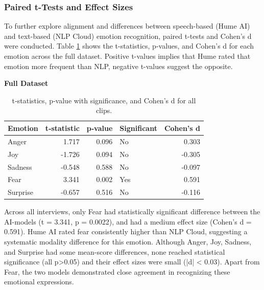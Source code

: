 \subsubsection{Paired t-Tests and Effect Sizes}
To further explore alignment and differences between speech-based (Hume AI) and text-based (NLP Cloud) emotion recognition, paired t-tests and Cohen's d were conducted. 
Table \ref{tab:t-test-all} shows the t-statistics, p-values, and Cohen's d for each emotion across the full dataset. Positive t-values implies that Hume rated that emotion more frequent than NLP, negative t-values suggest the opposite.

\begin{table}[H]
    \centering
    \caption*{\textbf{Full Dataset}}
    \begin{tabular}{lrrlr}
      \toprule
      \textbf{Emotion} & \textbf{t‐statistic} & \textbf{p‐value} & \textbf{Significant} & \textbf{Cohen’s d} \\
      \midrule
      Anger    &  1.717 & 0.096  & No  &  0.303 \\
      Joy      & -1.726 & 0.094  & No  & -0.305 \\
      Sadness  & -0.548 & 0.588  & No  & -0.097 \\
      Fear     &  3.341 & 0.002  & Yes &  0.591 \\
      Surprise & -0.657 & 0.516  & No  & -0.116 \\
      \bottomrule
    \end{tabular}
    \caption{t‐statistics, p‐value with significance, and Cohen’s d for all clips.}
    \label{tab:t-test-all}
\end{table}
Across all interviews, only Fear had statistically significant difference between the AI-models (t = 3.341, p = 0.0022), and had a medium effect size (Cohen's d = 0.591).
Hume AI rated fear consistently higher than NLP Cloud, suggesting a systematic modality difference for this emotion. 
Although Anger, Joy, Sadness, and Surprise had some mean-score differences, none reached statistical significance (all p>0.05) and their effect sizes were small (|d| < 0.03). 
Apart from Fear, the two models demonstrated close agreement in recognizing these emotional expressions. 

